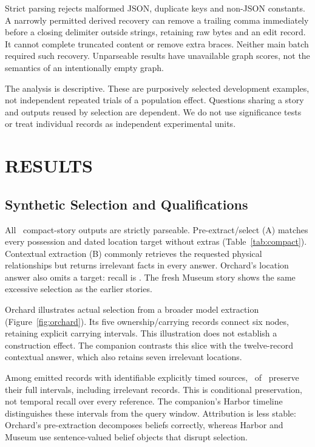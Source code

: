 \documentclass[a4paper,twoside]{article}
\begin{document}
Strict parsing rejects malformed JSON, duplicate keys and non-JSON constants. A narrowly permitted derived recovery can remove a trailing comma immediately before a closing delimiter outside strings, retaining raw bytes and an edit record. It cannot complete truncated content or remove extra braces. Neither main batch required such recovery. Unparseable results have unavailable graph scores, not the semantics of an intentionally empty graph.

The analysis is descriptive. These are purposively selected development examples, not independent repeated trials of a population effect. Questions sharing a story and outputs reused by selection are dependent. We do not use significance tests or treat individual records as independent experimental units.

\AliceFigure
\section{\uppercase{Results}}
\subsection{Synthetic Selection and Qualifications}
\noindent All \CompactCalls\ compact-story outputs are strictly parseable. Pre-extract/select (A) matches every possession and dated location target without extras (Table~\ref{tab:compact}). Contextual extraction (B) commonly retrieves the requested physical relationships but returns irrelevant facts in every answer. Orchard's location answer also omits a target: recall is \OrchardLocationRecall. The fresh Museum story shows the same excessive selection as the earlier stories.



Orchard illustrates actual selection from a broader model extraction (Figure~\ref{fig:orchard}). Its five ownership/carrying records connect six nodes, retaining explicit carrying intervals. This illustration does not establish a construction effect. The companion contrasts this slice with the twelve-record contextual answer, which also retains seven irrelevant locations.

Among emitted records with identifiable explicitly timed sources, \IntervalsKept\ of \IntervalsEligible\ preserve their full intervals, including irrelevant records. This is conditional preservation, not temporal recall over every reference. The companion's Harbor timeline distinguishes these intervals from the query window. Attribution is less stable: Orchard's pre-extraction decomposes beliefs correctly, whereas Harbor and Museum use sentence-valued belief objects that disrupt selection.
\end{document}
